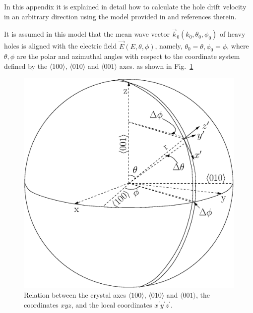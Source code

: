 \documentclass[epj]{svjour}
\begin{document}
\begin{appendices}
In this appendix it is explained in detail how to calculate the hole
drift velocity in an arbitrary direction using the model provided in
\cite{bart} and references therein.

It is assumed in this model that the mean wave vector
$\vec{k}_{0}(k_{0}, \theta_{0}, \phi_{0})$ of heavy holes is aligned
with the electric field $\vec{E}(E, \theta, \phi)$, namely,
$\theta_{0} = \theta, \phi_{0} = \phi$, where $\theta, \phi$ are the
polar and azimuthal angles with respect to the coordinate system
defined by the $\langle 100 \rangle$, $\langle 010 \rangle$ and
$\langle 001 \rangle$ axes. as shown in Fig.~\ref{f:vsphere}
  
\begin{figure}[htpb]
\centering
\includegraphics[width=0.8\linewidth]{vsphere}   
\caption{Relation between the crystal axes $\langle 100 \rangle$,
$\langle 010 \rangle$ and $\langle 001 \rangle$, the coordinates
$xyz$, and the local coordinates $x^{\prime} y^{\prime} z^{\prime}$.}
\label{f:vsphere} 
\end{figure} 


\end{appendices}
\end{document}
